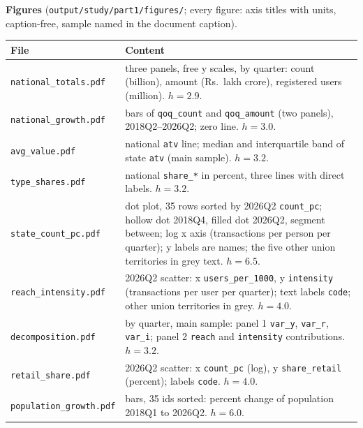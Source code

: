 \documentclass[10pt,a4paper]{article}
\newcommand{\f}[1]{\texttt{#1}}
\begin{document}
\textbf{Figures} (\f{output/study/part1/figures/}; every figure: axis titles with units, caption-free, sample
named in the document caption).
\par\noindent\begin{tabularx}{\textwidth}{@{}>{\raggedright\arraybackslash}p{} Y@{}}
\toprule
File & Content \\
\midrule
\f{national\_totals.pdf} & three panels, free y scales, by quarter: count (billion), amount (Rs.\ lakh crore),
  registered users (million). $h=2.9$. \\
\f{national\_growth.pdf} & bars of \f{qoq\_count} and \f{qoq\_amount} (two panels), 2018Q2--2026Q2; zero line.
  $h=3.0$. \\
\f{avg\_value.pdf} & national \f{atv} line; median and interquartile band of state \f{atv} (main sample). $h=3.2$. \\
\f{type\_shares.pdf} & national \f{share\_*} in percent, three lines with direct labels. $h=3.2$. \\
\f{state\_count\_pc.pdf} & dot plot, 35 rows sorted by 2026Q2 \f{count\_pc}; hollow dot 2018Q4, filled dot
  2026Q2, segment between; log x axis (transactions per person per quarter); y labels are names; the five other
  union territories in grey text. $h=6.5$. \\
\f{reach\_intensity.pdf} & 2026Q2 scatter: x \f{users\_per\_1000}, y \f{intensity} (transactions per user per
  quarter); text labels \f{code}; other union territories in grey. $h=4.0$. \\
\f{decomposition.pdf} & by quarter, main sample: panel 1 \f{var\_y}, \f{var\_r}, \f{var\_i}; panel 2 \f{reach} and
  \f{intensity} contributions. $h=3.2$. \\
\f{retail\_share.pdf} & 2026Q2 scatter: x \f{count\_pc} (log), y \f{share\_retail} (percent); labels \f{code}.
  $h=4.0$. \\
\f{population\_growth.pdf} & bars, 35 ids sorted: percent change of population 2018Q1 to 2026Q2. $h=6.0$. \\
\bottomrule
\end{tabularx}
\end{document}
